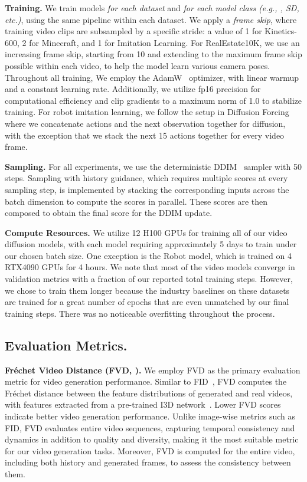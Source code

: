 \textbf{Training.} We train models \emph{for each dataset} and \emph{for each model class (e.g., \mtd, SD, etc.)}, using the same pipeline within each dataset. We apply a \emph{frame skip}, where training video clips are subsampled by a specific stride: a value of 1 for Kinetics-600, 2 for Minecraft, and 1 for Imitation Learning. For RealEstate10K, we use an increasing frame skip, starting from 10 and extending to the maximum frame skip possible within each video, to help the model learn various camera poses. Throughout all training, We employ the AdamW~\cite{loshchilov2017decoupled} optimizer, with linear warmup and a constant learning rate. Additionally, we utilize fp16 precision for computational efficiency and clip gradients to a maximum norm of 1.0 to stabilize training. For robot imitation learning, we follow the setup in Diffusion Forcing~\cite{chen2024diffusion} where we concatenate actions and the next observation together for diffusion, with the exception that we stack the next 15 actions together for every video frame.



\textbf{Sampling.} For all experiments, we use the deterministic DDIM~\cite{ddim} sampler with 50 steps. Sampling with history guidance, which requires multiple scores at every sampling step, is implemented by stacking the corresponding inputs across the batch dimension to compute the scores in parallel. These scores are then composed to obtain the final score for the DDIM update.


\textbf{Compute Resources.} We utilize 12 H100 GPUs for training all of our video diffusion models, with each model requiring approximately 5 days to train under our chosen batch size. One exception is the Robot model, which is trained on 4 RTX4090 GPUs for 4 hours. We note that most of the video models converge in validation metrics with a fraction of our reported total training steps. However, we chose to train them longer because the industry baselines on these datasets~\cite{yu2023magvit,ruhe2024rolling} are trained for a great number of epochs that are even unmatched by our final training steps. There was no noticeable overfitting throughout the process.

\subsection{Evaluation Metrics.}

\textbf{Fr\'echet Video Distance (FVD, \citet{unterthiner2018towards}).} We employ FVD as the primary evaluation metric for video generation performance. Similar to FID~\cite{heusel2017gans}, FVD computes the Fr\'echet distance between the feature distributions of generated and real videos, with features extracted from a pre-trained I3D network~\cite{carreira2017quo}. Lower FVD scores indicate better video generation performance. Unlike image-wise metrics such as FID, FVD evaluates entire video sequences, capturing temporal consistency and dynamics in addition to quality and diversity, making it the most suitable metric for our video generation tasks. Moreover, FVD is computed for the entire video, including both history and generated frames, to assess the consistency between them.


